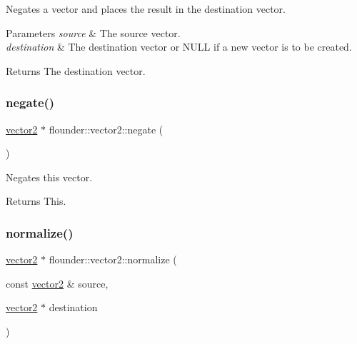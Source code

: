 Negates a vector and places the result in the destination vector. 


\begin{DoxyParams}{Parameters}
{\em source} & The source vector. \\
\hline
{\em destination} & The destination vector or N\+U\+LL if a new vector is to be created. \\
\hline
\end{DoxyParams}
\begin{DoxyReturn}{Returns}
The destination vector. 
\end{DoxyReturn}
\mbox{\label{classflounder_1_1vector2_a0fa7eef12302eaa8cd4f4ff030231e3d}} 
\subsubsection{\texorpdfstring{negate()}{negate()}\hspace{0.1cm}{\footnotesize\ttfamily [2/2]}}
{\footnotesize\ttfamily \hyperlink{classflounder_1_1vector2}{vector2} $\ast$ flounder\+::vector2\+::negate (\begin{DoxyParamCaption}{ }\end{DoxyParamCaption})}



Negates this vector. 

\begin{DoxyReturn}{Returns}
This. 
\end{DoxyReturn}
\mbox{\label{classflounder_1_1vector2_ac1bae04e41daf4ba46ae125db1c0b2b0}} 
\subsubsection{\texorpdfstring{normalize()}{normalize()}\hspace{0.1cm}{\footnotesize\ttfamily [1/2]}}
{\footnotesize\ttfamily \hyperlink{classflounder_1_1vector2}{vector2} $\ast$ flounder\+::vector2\+::normalize (\begin{DoxyParamCaption}\item[{const \hyperlink{classflounder_1_1vector2}{vector2} \&}]{source,  }\item[{\hyperlink{classflounder_1_1vector2}{vector2} $\ast$}]{destination }\end{DoxyParamCaption})\hspace{0.3cm}{\ttfamily [static]}}



